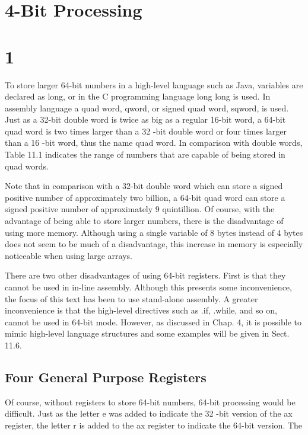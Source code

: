 \documentclass[10pt]{article}
\begin{document}
\section*{4-Bit Processing}
\section*{1}
To store larger 64-bit numbers in a high-level language such as Java, variables are declared as long, or in the C programming language long long is used. In assembly language a quad word, qword, or signed quad word, sqword, is used. Just as a 32-bit double word is twice as big as a regular 16-bit word, a 64-bit quad word is two times larger than a 32 -bit double word or four times larger than a 16 -bit word, thus the name quad word. In comparison with double words, Table 11.1 indicates the range of numbers that are capable of being stored in quad words.

Note that in comparison with a 32-bit double word which can store a signed positive number of approximately two billion, a 64-bit quad word can store a signed positive number of approximately 9 quintillion. Of course, with the advantage of being able to store larger numbers, there is the disadvantage of using more memory. Although using a single variable of 8 bytes instead of 4 bytes does not seem to be much of a disadvantage, this increase in memory is especially noticeable when using large arrays.

There are two other disadvantages of using 64-bit registers. First is that they cannot be used in in-line assembly. Although this presents some inconvenience, the focus of this text has been to use stand-alone assembly. A greater inconvenience is that the high-level directives such as .if, .while, and so on, cannot be used in 64-bit mode. However, as discussed in Chap. 4, it is possible to mimic high-level language structures and some examples will be given in Sect. 11.6.

\subsection*{Four General Purpose Registers}
Of course, without registers to store 64-bit numbers, 64-bit processing would be difficult. Just as the letter e was added to indicate the 32 -bit version of the ax register, the letter r is added to the ax register to indicate the 64-bit version. The
\end{document}
